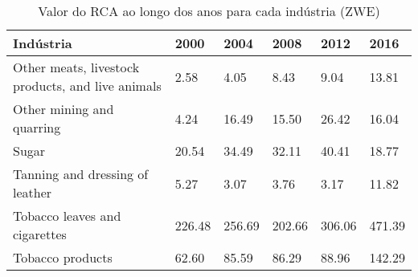 \begin{table}
\centering
\caption{Valor do RCA ao longo dos anos para cada indústria (ZWE)}
\begin{tabular}{p{6cm}p{1.5cm}p{1.5cm}p{1.5cm}p{1.5cm}p{1.5cm}}
\toprule
                                        Indústria &   2000 &   2004 &   2008 &   2012 &   2016 \\
\midrule
Other meats, livestock products, and live animals &   2.58 &   4.05 &   8.43 &   9.04 &  13.81 \\
                        Other mining and quarring &   4.24 &  16.49 &  15.50 &  26.42 &  16.04 \\
                                            Sugar &  20.54 &  34.49 &  32.11 &  40.41 &  18.77 \\
                  Tanning and dressing of leather &   5.27 &   3.07 &   3.76 &   3.17 &  11.82 \\
                    Tobacco leaves and cigarettes & 226.48 & 256.69 & 202.66 & 306.06 & 471.39 \\
                                 Tobacco products &  62.60 &  85.59 &  86.29 &  88.96 & 142.29 \\
\bottomrule
\end{tabular}
\end{table}

